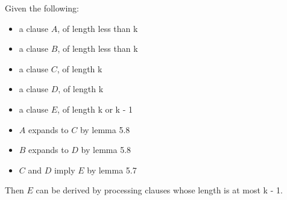 \documentclass[manuscript]{acmart}
\begin{document}
    \begin{lemma}
        Given the following:
        \begin{itemize}
            \item a clause $A$, of length less than k
            \item a clause $B$, of length less than k
            \item a clause $C$, of length k
            \item a clause $D$, of length k
            \item a clause $E$, of length k or k - 1
            \item $A$ expands to $C$ by lemma 5.8
            \item $B$ expands to $D$ by lemma 5.8
            \item $C$ and $D$ imply $E$ by lemma 5.7
        \end{itemize}
        Then $E$ can be derived by processing clauses whose length is at most k - 1.
    \end{lemma}
\end{document}

